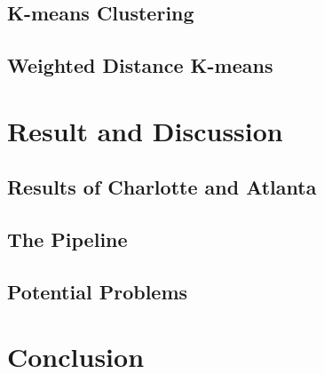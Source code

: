 \documentclass{article}
\begin{document}
\subsection{K-means Clustering}

\subsection{Weighted Distance K-means}

\section{Result and Discussion}

\subsection{Results of Charlotte and Atlanta}

\subsection{The Pipeline}

\subsection{Potential Problems}

\section{Conclusion}

\newpage



\end{document}
